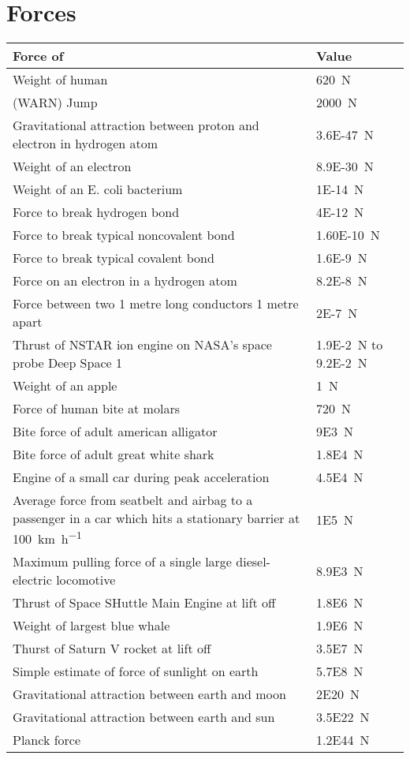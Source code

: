 \documentclass{article}
\begin{document}
\section{Forces}
\begin{table}[H]
	\centering
	\begin{tabularx}{\textwidth}{ X X }
		Force of & Value \\
		\hline
		Weight of human & \SI{620}{\newton} \\
		(WARN) Jump & \SI{2000}{\newton} \\
		Gravitational attraction between proton and electron in hydrogen atom & \SI{3.6E-47}{\newton} \\
		Weight of an electron & \SI{8.9E-30}{\newton} \\
		Weight of an E. coli bacterium & \SI{1E-14}{\newton} \\
		Force to break hydrogen bond & \SI{4E-12}{\newton} \\
		Force to break typical noncovalent bond & \SI{1.60E-10}{\newton} \\
		Force to break typical covalent bond & \SI{1.6E-9}{\newton} \\
		Force on an electron in a hydrogen atom & \SI{8.2E-8}{\newton} \\
		Force between two 1 metre long conductors 1 metre apart & \SI{2E-7}{\newton} \\
		Thrust of NSTAR ion engine on NASA's space probe Deep Space 1 & \SI{1.9E-2}{\newton} to \SI{9.2E-2}{\newton} \\
		Weight of an apple & \SI{1}{\newton} \\
		Force of human bite at molars & \SI{720}{\newton} \\
		Bite force of adult american alligator & \SI{9E3}{\newton} \\
		Bite force of adult great white shark & \SI{1.8E4}{\newton} \\
		Engine of a small car during peak acceleration & \SI{4.5E4}{\newton} \\
		Average force from seatbelt and airbag to a passenger in a car which hits a stationary barrier at \SI{100}{\km\per\hour} & \SI{1E5}{\newton} \\
		Maximum pulling force of a single large diesel-electric locomotive & \SI{8.9E3}{\newton} \\
		Thrust of Space SHuttle Main Engine at lift off & \SI{1.8E6}{\newton} \\
		Weight of largest blue whale & \SI{1.9E6}{\newton} \\
		Thurst of Saturn V rocket at lift off & \SI{3.5E7}{\newton} \\
		Simple estimate of force of sunlight on earth & \SI{5.7E8}{\newton} \\
		Gravitational attraction between earth and moon & \SI{2E20}{\newton} \\
		Gravitational attraction between earth and sun & \SI{3.5E22}{\newton} \\
		Planck force & \SI{1.2E44}{\newton} \\
	\end{tabularx}
\end{table}
\end{document}
